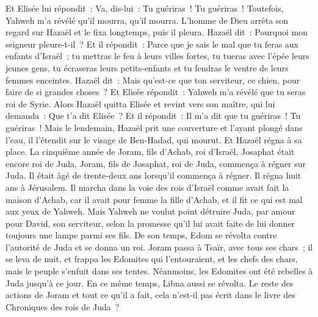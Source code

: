 \begin{multicols}{2}
Et Elisée lui répondit~: Va, dis-lui~: Tu guériras~! Tu guériras~! Toutefois, Yahweh m'a révélé qu'il mourra, qu'il mourra.
L'homme de Dieu arrêta son regard sur Hazaël et le fixa longtemps, puis il pleura.
Hazaël dit~: Pourquoi mon seigneur pleure-t-il~? Et il répondit~: Parce que je sais le mal que tu feras aux enfants d'Israël~; tu mettras le feu à leurs villes fortes, tu tueras avec l'épée leurs jeunes gens, tu écraseras leurs petits-enfants et tu fendras le ventre de leurs femmes enceintes.
Hazaël dit~: Mais qu'est-ce que ton serviteur, ce chien, pour faire de si grandes choses~? Et Elisée répondit~: Yahweh m'a révélé que tu seras roi de Syrie.
Alors Hazaël quitta Elisée et revint vers son maître, qui lui demanda~: Que t'a dit Elisée~? Et il répondit~: Il m'a dit que tu guériras~! Tu guériras~!
Mais le lendemain, Hazaël prit une couverture et l'ayant plongé dans l'eau, il l'étendit sur le visage de Ben-Hadad, qui mourut. Et Hazaël régna à sa place.
La cinquième année de Joram, fils d'Achab, roi d'Israël, Josaphat était encore roi de Juda, Joram, fils de Josaphat, roi de Juda, commença à régner sur Juda.
Il était âgé de trente-deux ans lorsqu'il commença à régner. Il régna huit ans à Jérusalem.
Il marcha dans la voie des rois d'Israël comme avait fait la maison d'Achab, car il avait pour femme la fille d'Achab, et il fit ce qui est mal aux yeux de Yahweh.
Mais Yahweh ne voulut point détruire Juda, par amour pour David, son serviteur, selon la promesse qu'il lui avait faite de lui donner toujours une lampe parmi ses fils.
De son temps, Edom se révolta contre l'autorité de Juda et se donna un roi.
Joram passa à Tsaïr, avec tous ses chars~; il se leva de nuit, et frappa les Edomites qui l'entouraient, et les chefs des chars, mais le peuple s'enfuit dans ses tentes.
Néanmoins, les Edomites ont été rebelles à Juda jusqu'à ce jour. En ce même temps, Libna aussi se révolta.
Le reste des actions de Joram et tout ce qu'il a fait, cela n'est-il pas écrit dans le livre des Chroniques des rois de Juda~?

\end{multicols}
